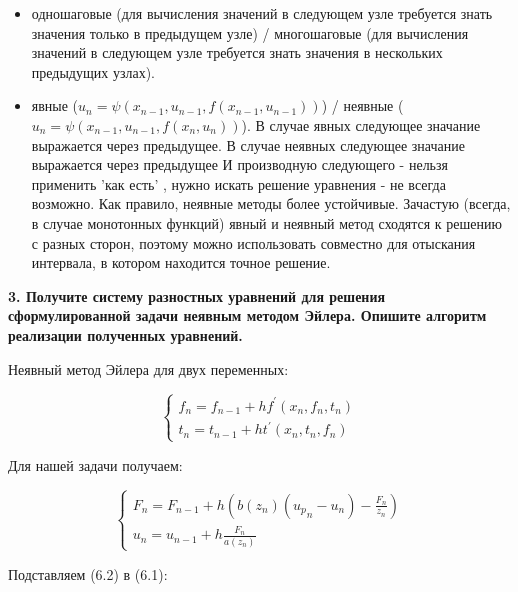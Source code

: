\documentclass[a4paper,12pt]{article}
\begin{document}
    \begin{itemize}
        \item одношаговые (для вычисления значений в следующем узле требуется знать значения
        только в предыдущем узле) / многошаговые (для вычисления значений в следующем узле требуется 
        знать значения в нескольких предыдущих узлах).
        \item явные ($u_n = \psi (x_{n-1}, u_{n-1}, f(x_{n-1}, u_{n-1}))$) / неявные
        ($u_n = \psi (x_{n-1}, u_{n-1}, f(x_{n}, u_{n}))$).
        В случае явных следующее значание выражается через предыдущее. В случае неявных
        следующее значание выражается через предыдущее И производную следующего - 
        нельзя применить 'как есть' , нужно искать решение уравнения - не всегда возможно.
        Как правило, неявные методы более устойчивые. Зачастую (всегда, в случае монотонных функций)
        явный и неявный метод сходятся к
        решению с разных сторон, поэтому можно использовать совместно для отыскания интервала, 
        в котором находится точное решение.
    \end{itemize}
    
    \vspace{1cm}
    \textbf{3. Получите систему разностных уравнений для решения сформулированной задачи неявным 
    методом Эйлера. Опишите алгоритм реализации полученных уравнений.}

    Неявный метод Эйлера для двух переменных: 

    \Large
    \begin{equation}
        \begin{cases}
            f_n = f_{n-1} + h f^{'}(x_n, f_n, t_n)\\
            t_n = t_{n-1} + h t^{'}(x_n, t_n, f_n)
        \end{cases}
    \end{equation}
    \normalsize

    Для нашей задачи получаем:

    \Large
    \begin{equation}
        \begin{cases}
            F_n = F_{n-1} + h(b(z_n)({u_p}_n - u_n) - \frac{F_n}{z_n})\\
            u_n = u_{n-1} + h\frac{F_n}{a(z_n)}
        \end{cases}
    \end{equation}
    \normalsize

    Подставляем (6.2) в (6.1):
\end{document}
